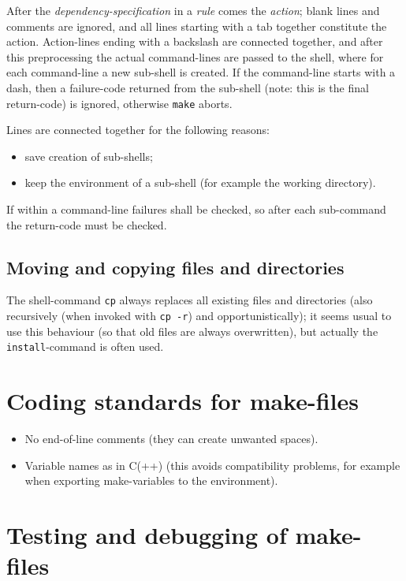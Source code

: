 \documentclass{book}
\begin{document}
After the \emph{dependency-specification} in a \emph{rule} comes the \emph{action}; blank lines and comments are ignored, and all lines starting with a tab together constitute the action. Action-lines ending with a backslash are connected together, and after this preprocessing the actual command-lines are passed to the shell, where for each command-line a new sub-shell is created. If the command-line starts with a dash, then a failure-code returned from the sub-shell (note: this is the final return-code) is ignored, otherwise \texttt{make} aborts.

Lines are connected together for the following reasons:
\begin{itemize}
\item save creation of sub-shells;
\item keep the environment of a sub-shell (for example the working directory).
\end{itemize}
If within a command-line failures shall be checked, so after each sub-command the return-code must be checked.


\subsection{Moving and copying files and directories}
\label{sec:makeTechniquescopying}

The shell-command \texttt{cp} always replaces all existing files and directories (also recursively (when invoked with \texttt{cp -r}) and opportunistically); it seems usual to use this behaviour (so that old files are always overwritten), but actually the \texttt{install}-command is often used.




\section{Coding standards for make-files}
\label{sec:makeCodingstandards}

\begin{itemize}
\item No end-of-line comments (they can create unwanted spaces).
\item Variable names as in C(++) (this avoids compatibility problems, for example when exporting make-variables to the environment).
\end{itemize}


\section{Testing and debugging of make-files}
\label{sec:makeTestingdebugging}
\end{document}
